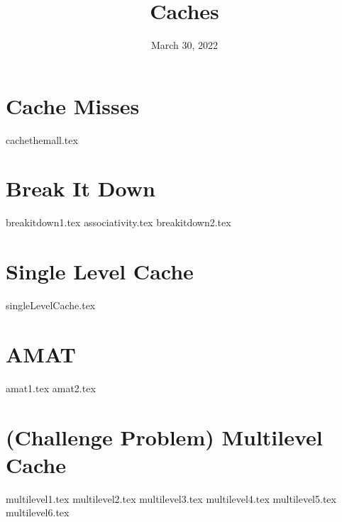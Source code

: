 \documentclass[11pt]{exam}
\title{Caches}
\date{March 30, 2022}
\begin{document}
\maketitle

\section{Cache Misses}
\begin{questions}
{cachethemall.tex}
\end{questions}


\section{Break It Down}
\begin{questions}
{breakitdown1.tex}
\newpage
{associativity.tex}
{breakitdown2.tex}
\end{questions}

\newpage
\section{Single Level Cache}
\begin{questions}
{singleLevelCache.tex}
\end{questions}

\newpage
\section{AMAT}
\begin{questions}
{amat1.tex}
{amat2.tex}
\end{questions}
\newpage

\section{(Challenge Problem) Multilevel Cache}
\begin{questions}
{multilevel1.tex}
{multilevel2.tex}
{multilevel3.tex}
{multilevel4.tex}
{multilevel5.tex}
{multilevel6.tex}
\end{questions}
\newpage

\end{document}

